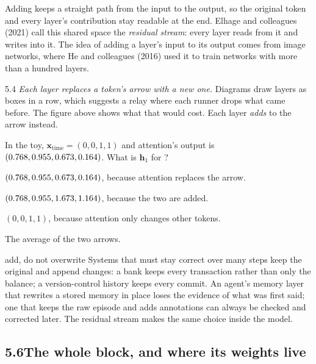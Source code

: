 \Why Adding keeps a straight path from the input to the output, so the original token and every layer's
contribution stay readable at the end. Elhage and colleagues (2021) call this shared space the \emph{residual
stream}: every layer reads from it and writes into it. The idea of adding a layer's input to its output comes
from image networks, where He and colleagues (2016) used it to train networks with more than a hundred layers.

\begin{wrongidea}{5.4}
\emph{Each layer replaces a token's arrow with a new one.} Diagrams draw layers as boxes in a row, which
suggests a relay where each runner drops what came before. The figure above shows what that would cost.
Each layer \emph{adds} to the arrow instead.
\end{wrongidea}

\begin{checkq}
In the toy, $\bm{x}_{\text{time}}=(0,0,1,1)$ and attention's output is $(0.768, 0.955, 0.673, 0.164)$. What is $\bm{h}_1$ for
?
\begin{options}
\item $(0.768, 0.955, 0.673, 0.164)$, because attention replaces the arrow.
\item $(0.768, 0.955, 1.673, 1.164)$, because the two are added.
\item $(0,0,1,1)$, because attention only changes other tokens.
\item The average of the two arrows.
\end{options}
\end{checkq}

\begin{principle}{add, do not overwrite}
Systems that must stay correct over many steps keep the original and append changes: a bank keeps every
transaction rather than only the balance; a version-control history keeps every commit. An agent's memory
layer that rewrites a stored memory in place loses the evidence of what was first said; one that keeps the raw
episode and adds annotations can always be checked and corrected later. The residual stream makes the same
choice inside the model.
\end{principle}


\subsection*{5.6\quad The whole block, and where its weights live}

